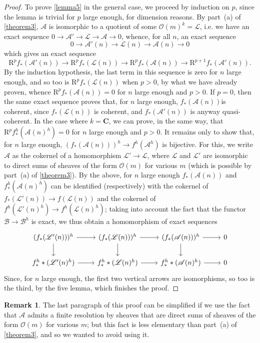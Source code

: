 \documentclass{article}
\theoremstyle{plain}
\theoremstyle{definition}
\newtheorem*{remark}{Remark}
\newcommand{\sh}[1]{{\mathscr{#1}}}
\newcommand{\RR}{\mathrm{R}}
\newcommand{\oldpage}[1]{\marginpar{\footnotesize$\Big\vert$ \textit{p.~#1}}}
\begin{document}
\begin{proof}
  To prove \cref{lemma5} in the general case, we proceed by induction on $p$, since the lemma is trivial for $p$ large enough, for dimension reasons.
  By part~(a) of \cref{theorem3}, $\sh{A}$ is isomorphic to a quotient of some $\sh{O}(m)^k=\sh{L}$, i.e. we have an exact sequence $0\to\sh{A}'\to\sh{L}\to\sh{A}\to0$, whence, for all $n$, an exact sequence
  \[
    0 \to \sh{A}'(n) \to \sh{L}(n) \to \sh{A}(n) \to 0
  \]
  which gives an exact sequence
  \[
    \RR^pf_*(\sh{A}'(n))
    \to \RR^pf_*(\sh{L}(n))
    \to \RR^pf_*(\sh{A}(n))
    \to \RR^{p+1}f_*(\sh{A}'(n)).
  \]
  By the induction hypothesis, the last term in this sequence is zero for $n$ large enough, and so too is $\RR^pf_*(\sh{L}(n))$ when $p>0$, by what we have already proven, whence $\RR^pf_*(\sh{A}(n))=0$ for $n$ large enough and $p>0$.
  If $p=0$, then the same exact sequence proves that, for $n$ large enough, $f_*(\sh{A}(n))$is coherent, since $f_*(\sh{L}(n))$ is coherent, and $f_*(\sh{A}'(n))$ is anyway quasi-coherent.
  In the case where $k=\mathbf{C}$, we can prove, in the same way, that $\RR^pf_*^h(\sh{A}(n)^h)=0$ for $n$ large enough and $p>0$.
  It remains only to show that, for $n$ large enough, $(f_*(\sh{A}(n)))^h\to f^h(\sh{A}^h)$ is bijective.
  For this, we write $\sh{A}$ as the cokernel of a homomorphism $\sh{L}'\to\sh{L}$, where $\sh{L}$ and $\sh{L}'$ are isomorphic to direct sums of sheaves of the form $\sh{O}(m)$ for various $m$ (which is possible by part~(a) of \cref{theorem3}).
  By the above, for $n$ large enough $f_*(\sh{A}(n))$ and $f_*^h(\sh{A}(n)^h)$ can be identified (respectively) with the cokernel of $f_*(\sh{L}'(n))\to f(\sh{L}(n))$ and the cokernel of $f^h(\sh{L}'(n)^h)\to f^h(\sh{L}(n)^h)$;
  taking into account the fact that the functor $\sh{B}\to\sh{B}^h$ is exact, we thus obtain a homomorphism of exact sequences
  \[
    \begin{tikzcd}
      (f_*(\sh{L}'(n)))^h \ar[r] \ar[d]
      & (f_*(\sh{L}(n)))^h \ar[r] \ar[d]
      & (f_*(\sh{A}(n)))^h \ar[r] \ar[d]
      & 0
    \\f_*^h*(\sh{L}'(n)^h) \ar[r]
      & f_*^h*(\sh{L}(n)^h) \ar[r]
      & f_*^h*(\sh{A}(n)^h) \ar[r]
      & 0
    \end{tikzcd}
  \]
\oldpage{2-14}
  Since, for $n$ large enough, the first two vertical arrows are isomorphisms, so too is the third, by the five lemma, which finishes the proof.
\end{proof}

\begin{remark}
  The last paragraph of this proof can be simplified if we use the fact that $\sh{A}$ admits a finite resolution by sheaves that are direct sums of sheaves of the form $\sh{O}(m)$ for various $m$;
  but this fact is less elementary than part~(a) of \cref{theorem3}, and so we wanted to avoid using it.
\end{remark}
\end{document}
